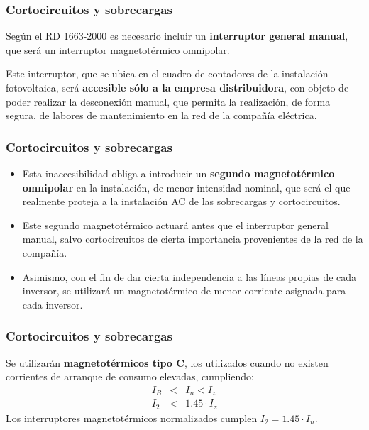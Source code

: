 \documentclass[serif, xcolor=dvipsnames]{beamer}
\begin{document}
\begin{frame}
\frametitle{Cortocircuitos y sobrecargas}
\begin{block}
{}

Según el RD 1663-2000 es necesario incluir un\textbf{ interruptor
general manual}, que será un interruptor magnetotérmico omnipolar. 

Este interruptor, que se ubica en el cuadro de contadores de la instalación
fotovoltaica, será \textbf{accesible sólo a la empresa distribuidora},
con objeto de poder realizar la desconexión manual, que permita la
realización, de forma segura, de labores de mantenimiento en la red
de la compañía eléctrica. 

\end{block}

\end{frame}

\begin{frame}
\frametitle{Cortocircuitos y sobrecargas}
\begin{itemize}
\item Esta inaccesibilidad obliga a introducir un \textbf{segundo magnetotérmico
omnipolar} en la instalación, de menor intensidad nominal, que será
el que realmente proteja a la instalación AC de las sobrecargas y
cortocircuitos.
\item Este segundo magnetotérmico actuará antes que el interruptor general
manual, salvo cortocircuitos de cierta importancia provenientes de
la red de la compañía. 
\item Asimismo, con el fin de dar cierta independencia a las líneas propias
de cada inversor, se utilizará un magnetotérmico de menor corriente
asignada para cada inversor.
\end{itemize}

\end{frame}

\begin{frame}
\frametitle{Cortocircuitos y sobrecargas}
\begin{block}
{}

Se utilizarán \textbf{magnetotérmicos tipo C}, los utilizados cuando
no existen corrientes de arranque de consumo elevadas, cumpliendo:\begin{eqnarray*}
I_{B} & < & I_{n}<I_{z}\\
I_{2} & < & 1.45\cdot I_{z}\end{eqnarray*}
Los interruptores magnetotérmicos normalizados cumplen $I_{2}=1.45\cdot I_{n}$.

\end{block}

\end{frame}
\end{document}
